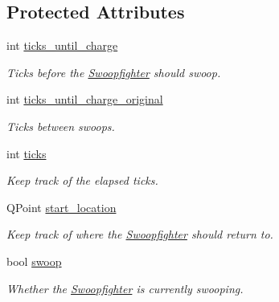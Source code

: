 \subsection*{Protected Attributes}
\begin{DoxyCompactItemize}
\item 
\hypertarget{classSwoopfighter_af3483b706640a6311f6a1659fd485764}{
int \hyperlink{classSwoopfighter_af3483b706640a6311f6a1659fd485764}{ticks\_\-until\_\-charge}}
\label{classSwoopfighter_af3483b706640a6311f6a1659fd485764}

\begin{DoxyCompactList}\small\item\em Ticks before the \hyperlink{classSwoopfighter}{Swoopfighter} should swoop. \end{DoxyCompactList}\item 
\hypertarget{classSwoopfighter_af6f2e44ca84be95c191b0f6ff3fc3b24}{
int \hyperlink{classSwoopfighter_af6f2e44ca84be95c191b0f6ff3fc3b24}{ticks\_\-until\_\-charge\_\-original}}
\label{classSwoopfighter_af6f2e44ca84be95c191b0f6ff3fc3b24}

\begin{DoxyCompactList}\small\item\em Ticks between swoops. \end{DoxyCompactList}\item 
\hypertarget{classSwoopfighter_a60830b449baf49a768304530ed2c9601}{
int \hyperlink{classSwoopfighter_a60830b449baf49a768304530ed2c9601}{ticks}}
\label{classSwoopfighter_a60830b449baf49a768304530ed2c9601}

\begin{DoxyCompactList}\small\item\em Keep track of the elapsed ticks. \end{DoxyCompactList}\item 
\hypertarget{classSwoopfighter_a71dfa74fb88e8a89ce3a70ba968d8ffa}{
QPoint \hyperlink{classSwoopfighter_a71dfa74fb88e8a89ce3a70ba968d8ffa}{start\_\-location}}
\label{classSwoopfighter_a71dfa74fb88e8a89ce3a70ba968d8ffa}

\begin{DoxyCompactList}\small\item\em Keep track of where the \hyperlink{classSwoopfighter}{Swoopfighter} should return to. \end{DoxyCompactList}\item 
\hypertarget{classSwoopfighter_a858be11c9e75343caa5c0822f562a338}{
bool \hyperlink{classSwoopfighter_a858be11c9e75343caa5c0822f562a338}{swoop}}
\label{classSwoopfighter_a858be11c9e75343caa5c0822f562a338}

\begin{DoxyCompactList}\small\item\em Whether the \hyperlink{classSwoopfighter}{Swoopfighter} is currently swooping. \end{DoxyCompactList}\end{DoxyCompactItemize}


